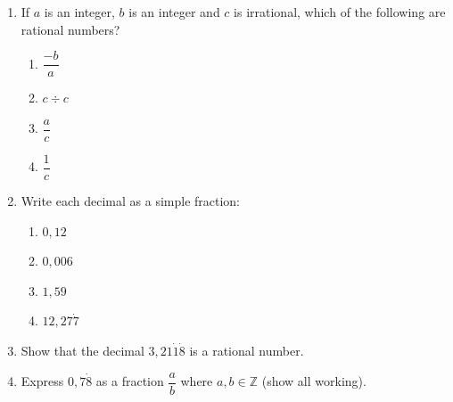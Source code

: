 \begin{eocexercises}{}


\begin{enumerate}[itemsep=5pt, label=\textbf{\arabic*}. ] 
\item If $a$ is an integer, $b$ is an integer and $c$ is irrational, which of the following are rational numbers?
    \begin{enumerate}[itemsep=5pt, label=\textbf{(\alph*)} ] 
    \item $\dfrac{-b}{a}$
    \item $c \div c$
    \item $\dfrac{a}{c}$
    \item $\dfrac{1}{c}$
    \end{enumerate}
\item Write each decimal as a simple fraction:
    \begin{enumerate}[itemsep=5pt, label=\textbf{(\alph*)} ] 
    \item $0,12$
    \item $0,006$
    \item $1,59$
    \item $12,27\dot{7}$
    \end{enumerate}
\item Show that the decimal $3,21\dot{1}\dot{8}$ is a rational number.
\item Express $0,7\dot{8}$ as a fraction $\dfrac{a}{b}$ where $a,b\in \mathbb{Z}$ (show all working).




\end{enumerate}
\end{eocexercises}
